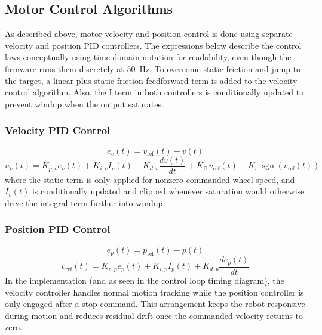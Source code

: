 \documentclass[11pt]{article}
\begin{document}
\subsection{Motor Control Algorithms}
As described above, motor velocity and position control is done using separate velocity and position PID controllers.
The expressions below describe the control laws conceptually using time-domain notation for readability, even though the
firmware runs them discretely at \SI{50}{Hz}. To overcome static friction and jump to the target, a linear plus static-friction feedforward term is 
added to the velocity control algorithm. Also, the I term in both controllers is conditionally updated to prevent windup when the output saturates.
\subsubsection{Velocity PID Control}
\begin{equation*}
e_v(t) = v_{\mathrm{ref}}(t) - v(t)
\end{equation*}
\begin{equation*}
u_v(t) = K_{p,v} e_v(t) + K_{i,v} I_v(t) - K_{d,v}\frac{dv(t)}{dt} + K_{\mathrm{ff}}\,v_{\mathrm{ref}}(t) +
K_s\,\operatorname{sgn}\!\left(v_{\mathrm{ref}}(t)\right)
\end{equation*}
\noindent where the static term is only applied for nonzero commanded wheel speed, and \(I_v(t)\) is conditionally
          updated and clipped whenever saturation would otherwise drive the integral term further into windup.
\subsubsection{Position PID Control}
\begin{equation*}
e_p(t) = p_{\mathrm{ref}}(t) - p(t)
\end{equation*}
\begin{equation*}
v_{\mathrm{ref}}(t) = K_{p,p} e_p(t) + K_{i,p} I_p(t) + K_{d,p}\frac{d e_p(t)}{dt}
\end{equation*}
\noindent In the implementation (and as seen in the control loop timing diagram), the velocity controller
          handles normal motion tracking while the position controller is only engaged after a stop command. This
          arrangement keeps the robot responsive during motion and reduces residual drift once the commanded velocity
          returns to zero. 
\end{document}
